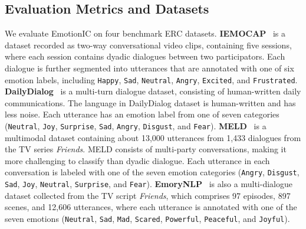 \documentclass{SCIS2019}
\begin{document}
\subsection{Evaluation Metrics and Datasets}
We evaluate EmotionIC on four benchmark ERC datasets.
\textbf{IEMOCAP}~\cite{busso2008iemocap} is a dataset recorded as two-way conversational video clips, containing five sessions, where each session contains dyadic dialogues between two participators. Each dialogue is further segmented into utterances that are annotated with one of six emotion labels, including \texttt{Happy}, \texttt{Sad}, \texttt{Neutral}, \texttt{Angry}, \texttt{Excited}, and \texttt{Frustrated}. 
\textbf{DailyDialog}~\cite{li2017dailydialog} is a multi-turn dialogue dataset, consisting of human-written daily communications. The language in DailyDialog dataset is human-written and has less noise. Each utterance has an emotion label from one of seven categories (\texttt{Neutral}, \texttt{Joy}, \texttt{Surprise}, \texttt{Sad}, \texttt{Angry}, \texttt{Disgust}, and \texttt{Fear}). 
\textbf{MELD}~\cite{poria2019meld} is a multimodal dataset containing about 13,000 utterances from 1,433 dialogues from the TV series \textit{Friends}. MELD consists of multi-party conversations, making it more challenging to classify than dyadic dialogue. Each utterance in each conversation is labeled with one of the seven emotion categories (\texttt{Angry}, \texttt{Disgust}, \texttt{Sad}, \texttt{Joy}, \texttt{Neutral}, \texttt{Surprise}, and \texttt{Fear}). 
\textbf{EmoryNLP}~\cite{zahiri2017emotion} is also a multi-dialogue dataset collected from the TV script \textit{Friends}, which comprises 97 episodes, 897 scenes, and 12,606 utterances, where each utterance is annotated with one of the seven emotions (\texttt{Neutral}, \texttt{Sad}, \texttt{Mad}, \texttt{Scared}, \texttt{Powerful}, \texttt{Peaceful}, and \texttt{Joyful}).
\end{document}
